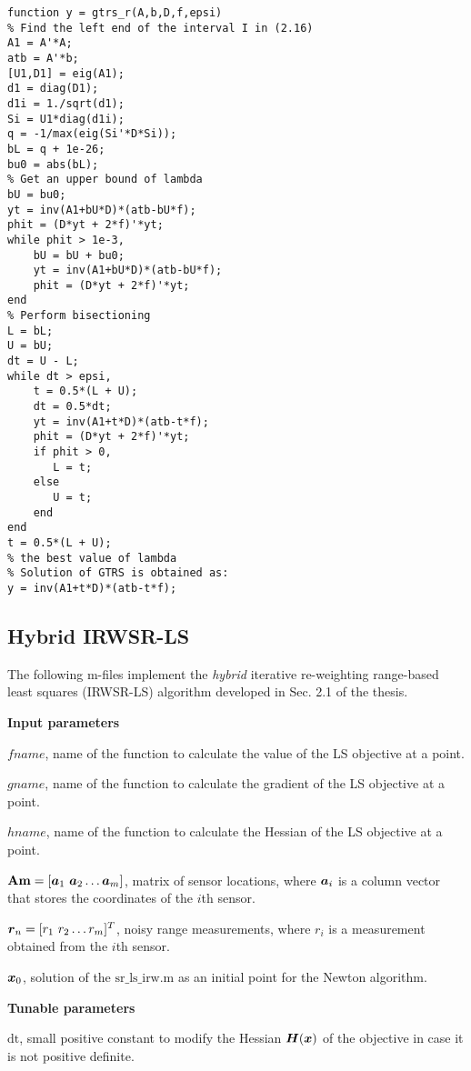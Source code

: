 \begin{lstlisting}
function y = gtrs_r(A,b,D,f,epsi)
% Find the left end of the interval I in (2.16)
A1 = A'*A;
atb = A'*b;
[U1,D1] = eig(A1);
d1 = diag(D1);
d1i = 1./sqrt(d1);
Si = U1*diag(d1i);
q = -1/max(eig(Si'*D*Si));
bL = q + 1e-26;
bu0 = abs(bL);
% Get an upper bound of lambda
bU = bu0;
yt = inv(A1+bU*D)*(atb-bU*f);
phit = (D*yt + 2*f)'*yt;
while phit > 1e-3,
    bU = bU + bu0;
    yt = inv(A1+bU*D)*(atb-bU*f);
    phit = (D*yt + 2*f)'*yt;
end
% Perform bisectioning
L = bL;
U = bU;
dt = U - L;
while dt > epsi,
    t = 0.5*(L + U);
    dt = 0.5*dt;
    yt = inv(A1+t*D)*(atb-t*f);
    phit = (D*yt + 2*f)'*yt;
    if phit > 0,
       L = t;
    else
       U = t;
    end
end
t = 0.5*(L + U);
% the best value of lambda
% Solution of GTRS is obtained as:
y = inv(A1+t*D)*(atb-t*f);
\end{lstlisting}

\subsection{Hybrid IRWSR-LS}

The following m-files implement the \textit{hybrid} iterative re-weighting range-based least squares (IRWSR-LS) algorithm developed in Sec. 2.1 of the thesis. 

\phantom{m}

\noindent
\textbf{Input parameters}

\noindent
$fname$, name of the function to calculate the value of the LS objective at a point.

\noindent
$gname$, name of the function to calculate the gradient of the LS objective at a point.

\noindent
$hname$, name of the function to calculate the Hessian of the LS objective at a point.

\noindent
$\mbox{\textbf{Am}} = [\mbox{\boldmath$a$}_1 \ \mbox{\boldmath$a$}_2 \ldots \mbox{\boldmath$a$}_m]$, matrix of sensor locations, where $\mbox{\boldmath$a$}_i$ is a column vector that stores the coordinates of the $i$th sensor.

\noindent
$\mbox{\boldmath$r$}_n = [r_1 \ r_2 \ldots r_m]^T$, noisy range measurements, where $r_i$ is a measurement obtained from the $i$th sensor.

\noindent
$\mbox{\boldmath$x$}_0$, solution of the $\mbox{sr\_ls\_irw.m}$ as an initial point for the Newton algorithm.

\noindent
\textbf{Tunable parameters}

\noindent
$\mbox{dt}$, small positive constant to modify the Hessian $\mbox{\boldmath$H$}(\mbox{\boldmath$x$})$ of the objective in case it is not positive definite.

